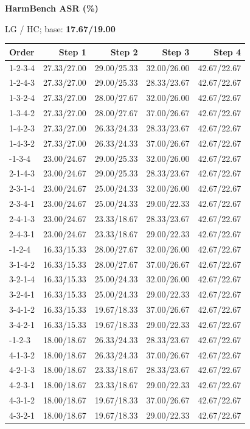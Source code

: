 \begin{minipage}[t]{0.33\linewidth}
\centering
{\bfseries HarmBench ASR (\%)}\par
{\small LG / HC; base: \textbf{17.67/19.00}}\par\vspace{5pt}
\small\setlength{\tabcolsep}{3.5pt}\renewcommand{\arraystretch}{1.19}
\begin{tabular}{@{}lrrrr@{}}
\toprule Order & Step 1 & Step 2 & Step 3 & Step 4 \\
\midrule
1-2-3-4 & 27.33/27.00 & 29.00/25.33 & 32.00/26.00 & 42.67/22.67 \\
1-2-4-3 & 27.33/27.00 & 29.00/25.33 & 28.33/23.67 & 42.67/22.67 \\
1-3-2-4 & 27.33/27.00 & 28.00/27.67 & 32.00/26.00 & 42.67/22.67 \\
1-3-4-2 & 27.33/27.00 & 28.00/27.67 & 37.00/26.67 & 42.67/22.67 \\
1-4-2-3 & 27.33/27.00 & 26.33/24.33 & 28.33/23.67 & 42.67/22.67 \\
1-4-3-2 & 27.33/27.00 & 26.33/24.33 & 37.00/26.67 & 42.67/22.67 \\
\addlinespace[3pt]
2-1-3-4 & 23.00/24.67 & 29.00/25.33 & 32.00/26.00 & 42.67/22.67 \\
2-1-4-3 & 23.00/24.67 & 29.00/25.33 & 28.33/23.67 & 42.67/22.67 \\
2-3-1-4 & 23.00/24.67 & 25.00/24.33 & 32.00/26.00 & 42.67/22.67 \\
2-3-4-1 & 23.00/24.67 & 25.00/24.33 & 29.00/22.33 & 42.67/22.67 \\
2-4-1-3 & 23.00/24.67 & 23.33/18.67 & 28.33/23.67 & 42.67/22.67 \\
2-4-3-1 & 23.00/24.67 & 23.33/18.67 & 29.00/22.33 & 42.67/22.67 \\
\addlinespace[3pt]
3-1-2-4 & 16.33/15.33 & 28.00/27.67 & 32.00/26.00 & 42.67/22.67 \\
3-1-4-2 & 16.33/15.33 & 28.00/27.67 & 37.00/26.67 & 42.67/22.67 \\
3-2-1-4 & 16.33/15.33 & 25.00/24.33 & 32.00/26.00 & 42.67/22.67 \\
3-2-4-1 & 16.33/15.33 & 25.00/24.33 & 29.00/22.33 & 42.67/22.67 \\
3-4-1-2 & 16.33/15.33 & 19.67/18.33 & 37.00/26.67 & 42.67/22.67 \\
3-4-2-1 & 16.33/15.33 & 19.67/18.33 & 29.00/22.33 & 42.67/22.67 \\
\addlinespace[3pt]
4-1-2-3 & 18.00/18.67 & 26.33/24.33 & 28.33/23.67 & 42.67/22.67 \\
4-1-3-2 & 18.00/18.67 & 26.33/24.33 & 37.00/26.67 & 42.67/22.67 \\
4-2-1-3 & 18.00/18.67 & 23.33/18.67 & 28.33/23.67 & 42.67/22.67 \\
4-2-3-1 & 18.00/18.67 & 23.33/18.67 & 29.00/22.33 & 42.67/22.67 \\
4-3-1-2 & 18.00/18.67 & 19.67/18.33 & 37.00/26.67 & 42.67/22.67 \\
4-3-2-1 & 18.00/18.67 & 19.67/18.33 & 29.00/22.33 & 42.67/22.67 \\
\bottomrule
\end{tabular}
\end{minipage}
